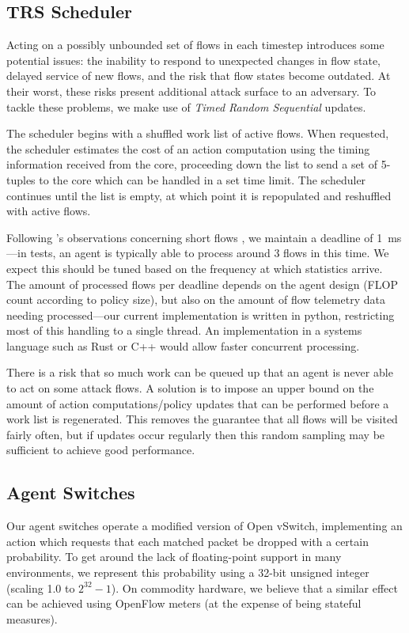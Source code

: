 \documentclass[10pt, times, conference, letterpaper]{IEEEtran}
\begin{document}
\subsection{TRS Scheduler}
Acting on a possibly unbounded set of flows in each timestep introduces some potential issues: the inability to respond to unexpected changes in flow state, delayed service of new flows, and the risk that flow states become outdated.
At their worst, these risks present additional attack surface to an adversary.
To tackle these problems, we make use of \emph{Timed Random Sequential} updates.

The scheduler begins with a shuffled work list of active flows.
When requested, the scheduler estimates the cost of an action computation using the timing information received from the core, proceeding down the list to send a set of 5-tuples to the core which can be handled in a set time limit.
The scheduler continues until the list is empty, at which point it is repopulated and reshuffled with active flows.

Following \citeauthor{DBLP:conf/sigcomm/ChenL0L18}'s observations concerning short flows \cite{DBLP:conf/sigcomm/ChenL0L18}, we maintain a deadline of \SI{1}{\milli\second}---in tests, an agent is typically able to process around 3 flows in this time.
We expect this should be tuned based on the frequency at which statistics arrive.
The amount of processed flows per deadline depends on the agent design (FLOP count according to policy size), but also on the amount of flow telemetry data needing processed---our current implementation is written in python, restricting most of this handling to a single thread.
An implementation in a systems language such as Rust or C++ would allow faster concurrent processing.

There is a risk that so much work can be queued up that an agent is never able to act on some attack flows.
A solution is to impose an upper bound on the amount of action computations/policy updates that can be performed before a work list is regenerated.
This removes the guarantee that all flows will be visited fairly often, but if updates occur regularly then this random sampling may be sufficient to achieve good performance.

\subsection{Agent Switches}
Our agent switches operate a modified version of Open vSwitch, implementing an action which requests that each matched packet be dropped with a certain probability.
To get around the lack of floating-point support in many environments, we represent this probability using a 32-bit unsigned integer (scaling \num{1.0} to $2^{32}-1$).
On commodity hardware, we believe that a similar effect can be achieved using OpenFlow meters (at the expense of being stateful measures).
\end{document}
